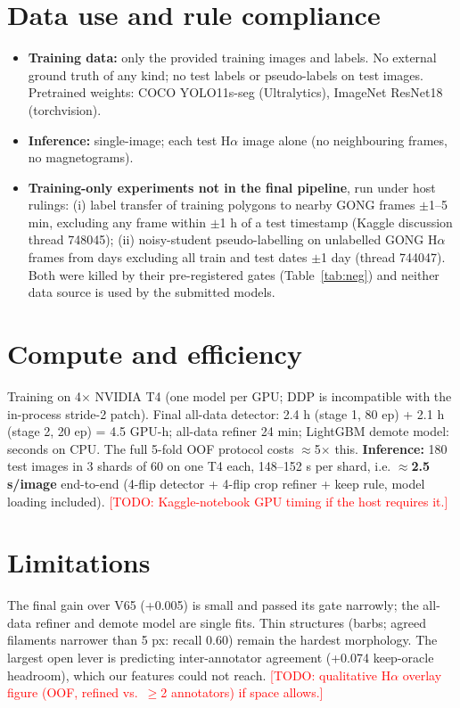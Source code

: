 \documentclass[10pt,twocolumn]{article}
\newcommand{\todo}[1]{\textcolor{red}{[TODO: #1]}}
\begin{document}
\section{Data use and rule compliance}
\begin{itemize}
\item \textbf{Training data:} only the provided training images and labels. No external ground truth of any
kind; no test labels or pseudo-labels on test images. Pretrained weights: COCO YOLO11s-seg (Ultralytics),
ImageNet ResNet18 (torchvision).
\item \textbf{Inference:} single-image; each test H$\alpha$ image alone (no neighbouring frames, no
magnetograms).
\item \textbf{Training-only experiments not in the final pipeline}, run under host rulings: (i) label transfer of
training polygons to nearby GONG frames $\pm$1--5 min, excluding any frame within $\pm$1 h of a test timestamp
(Kaggle discussion thread 748045); (ii) noisy-student pseudo-labelling on unlabelled GONG H$\alpha$ frames from
days excluding all train and test dates $\pm$1 day (thread 744047). Both were killed by their pre-registered
gates (Table~\ref{tab:neg}) and neither data source is used by the submitted models.
\end{itemize}

\section{Compute and efficiency}
Training on 4$\times$ NVIDIA T4 (one model per GPU; DDP is incompatible with the in-process stride-2 patch).
Final all-data detector: 2.4 h (stage 1, 80 ep) + 2.1 h (stage 2, 20 ep) = 4.5 GPU-h; all-data refiner 24 min;
LightGBM demote model: seconds on CPU. The full 5-fold OOF protocol costs $\approx$5$\times$ this.
\textbf{Inference:} 180 test images in 3 shards of 60 on one T4 each, 148--152 s per shard, i.e.
$\approx$\textbf{2.5 s/image} end-to-end (4-flip detector + 4-flip crop refiner + keep rule, model loading
included). \todo{Kaggle-notebook GPU timing if the host requires it.}

\section{Limitations}
The final gain over V65 (+0.005) is small and passed its gate narrowly; the all-data refiner and demote model
are single fits. Thin structures (barbs; agreed filaments narrower than 5 px: recall 0.60) remain the hardest morphology. The
largest open lever is predicting inter-annotator agreement (+0.074 keep-oracle headroom), which our features
could not reach.
\todo{qualitative H$\alpha$ overlay figure (OOF, refined vs.\ $\ge$2 annotators) if space allows.}
\end{document}
